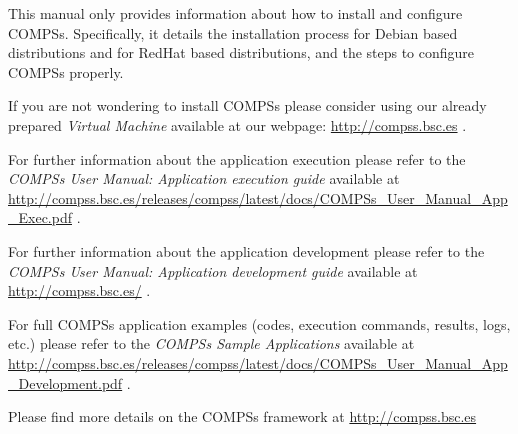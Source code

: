 \documentclass[a4paper,12pt]{article}
\begin{document}
  {
    This manual only provides information about how to install and configure COMPSs. Specifically, it details the installation 
    process for Debian based distributions and for RedHat based distributions, and the steps to configure COMPSs properly.
    \newline
    
    If you are not wondering to install COMPSs please consider using our already prepared \textit{Virtual Machine} available
    at our webpage: \url{http://compss.bsc.es} .
    \newline
    
    For further information about the application execution please refer to the \textit{COMPSs User Manual: Application execution
    guide} available at \url{http://compss.bsc.es/releases/compss/latest/docs/COMPSs_User_Manual_App_Exec.pdf} .
    
    For further information about the application development please refer to the \textit{COMPSs User Manual: Application development
    guide} available at \url{http://compss.bsc.es/} .
    
    For full COMPSs application examples (codes, execution commands, results, logs, etc.) please refer to the \textit{COMPSs Sample 
    Applications} available at \url{http://compss.bsc.es/releases/compss/latest/docs/COMPSs_User_Manual_App_Development.pdf} .
  }
  
  \setcounter{tocdepth}{6}
  \tableofcontents
  \listoffigures
  \listoftables
    
  \newpage

    
  

  
  
  
  
          
  
  
  

  
           
  

  
  
  
  \newpage

  \vspace*{\fill} 
  \begin{center}
    \large { Please find more details on the COMPSs framework at }
    \huge{\url{http://compss.bsc.es}}
  \end{center}    
  \vspace*{\fill} 
           
\end{document}
